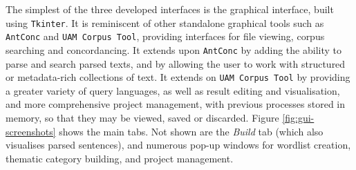 The simplest of the three developed interfaces is the graphical interface, built using \texttt{Tkinter}. It is reminiscent of other standalone graphical tools such as \texttt{AntConc} and \texttt{UAM Corpus Tool}, providing interfaces for file viewing, corpus searching and concordancing. It extends upon \texttt{AntConc} by adding the ability to parse and search parsed texts, and by allowing the user to work with structured or metadata\hyp{}rich collections of text. It extends on \texttt{UAM Corpus Tool} by providing a greater variety of query languages, as well as result editing and visualisation, and more comprehensive project management, with previous processes stored in memory, so that they may be viewed, saved or discarded. Figure \ref{fig:gui-screenshots} shows the main tabs. Not shown are the \emph{Build} tab (which also visualises parsed sentences), and numerous pop\hyp{}up windows for wordlist creation, thematic category building, and project management.

